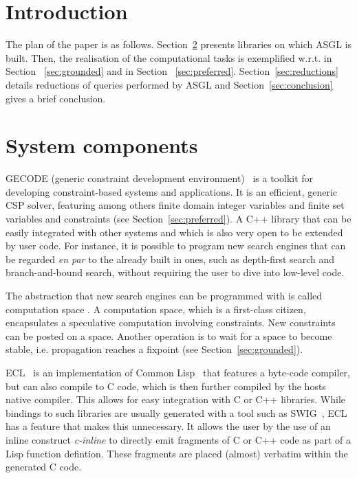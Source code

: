 \documentclass[runningheads,a4paper]{llncs}
\begin{document}
\section{Introduction}\label{sec:introduction}

The plan of the paper is as follows. Section~\ref{sec:components}
presents libraries on which ASGL is built. Then, the realisation of
the computational tasks is exemplified w.r.t. \grsem{} in Section~
\ref{sec:grounded} and \prsem{} in Section~
\ref{sec:preferred}. Section~\ref{sec:reductions} details reductions
of queries performed by ASGL and Section~\ref{sec:conclusion} gives
a brief conclusion.

\section{System components}\label{sec:components}

GECODE (generic constraint development environment)~\cite{gecode} is a
toolkit for developing constraint-based systems and applications. It
is an efficient, generic CSP solver, featuring among others finite
domain integer variables and finite set variables and constraints (see
Section~\ref{sec:preferred}). A C++ library that can be easily
integrated with other systems and which is also very open to be
extended by user code. For instance, it is possible to program new
search engines that can be regarded \textit{en par} to the already
built in ones, such as depth-first search and branch-and-bound search,
without requiring the user to dive into low-level code.

The abstraction that new search engines can be programmed with is
called computation space \cite{Engines:97}. A computation space, which
is a first-class citizen, encapsulates a speculative computation
involving constraints. New constraints can be posted on a
space. Another operation is to wait for a space to become stable,
i.e. propagation reaches a fixpoint (see Section~\ref{sec:grounded}).

ECL~\cite{ecl} is an implementation of Common
Lisp~\cite{Steele:1990:CLL} that features a byte-code compiler, but
can also compile to C code, which is then further compiled by the
hosts native compiler. This allows for easy integration with C or C++
libraries. While bindings to such libraries are usually generated with
a tool such as SWIG~\cite{swig}, ECL has a feature that makes this
unnecessary. It allows the user by the use of an inline construct
\textit{c-inline} to directly emit fragments of C or C++ code as part
of a Lisp function defintion. These fragments are placed (almost)
verbatim within the generated C code.
\end{document}
